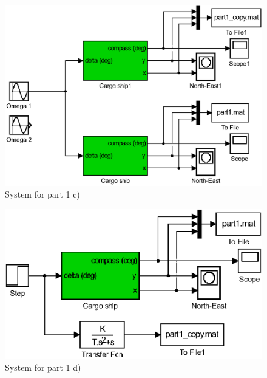 \begin{figure}[H]
    \begin{center}
    \includegraphics[width=1\linewidth]{Part1_pics/p5p1c.eps}
    \caption{System for part 1 c)}\label{sim:part1c}
    \end{center}
\end{figure}

\begin{figure}[H]
    \begin{center}
    \includegraphics[width=1\linewidth]{Part1_pics/p5p1d.eps}
    \caption{System for part 1 d)}
    \label{sim:part1d}
    \end{center}
\end{figure}

